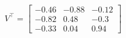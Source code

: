 \documentclass[preview]{standalone}
\begin{document}
\begin{align*}
V^\top=\left[\begin{matrix}-0.46&-0.88&-0.12\\-0.82&0.48&-0.3\\-0.33&0.04&0.94\end{matrix}\right]
\end{align*}
\end{document}
